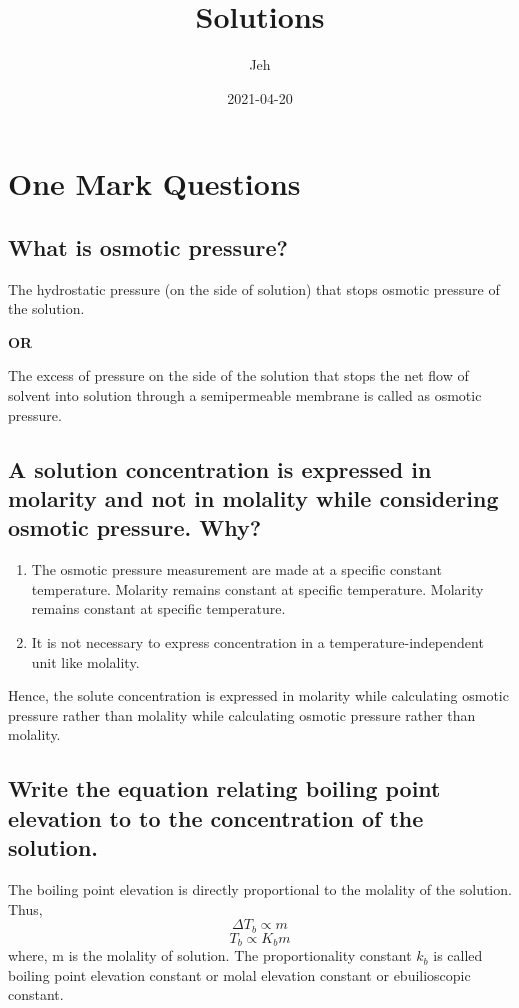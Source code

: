\documentclass{article}
\title{Solutions}
\date{2021-04-20}
\author{Jeh}
\begin{document}
\maketitle
{}
   \section{One Mark Questions}
   \subsection{What is osmotic pressure?}
   The hydrostatic pressure (on the side of solution) that stops
   osmotic pressure of the solution.
   \begin{center} \textbf{OR} \end{center}
   The excess of pressure on the side of the solution that stops the
   net flow of solvent into solution through a semipermeable membrane
   is called as osmotic pressure.

   \subsection{A solution concentration is expressed in molarity and
   not in molality while considering osmotic pressure. Why?}
   \begin{enumerate}
	\item The osmotic pressure measurement are made at a specific
        constant temperature. Molarity remains constant at specific
	temperature. Molarity remains constant at specific
	temperature.
    	\item It is not necessary to express concentration in a
	temperature-independent unit like molality.
   \end{enumerate}
   Hence, the solute concentration is expressed in molarity while
   calculating osmotic pressure rather than molality while calculating
   osmotic pressure rather than molality.

   \subsection{Write the equation relating boiling point elevation to
   to the concentration of the solution.}
   The boiling point elevation is directly proportional to the molality
   of the solution. Thus,
   \begin{equation} \Delta T_b \propto m \end{equation}
   \begin{equation} T_b \propto K_b m \end{equation}
   where, m is the molality of solution. The proportionality constant
   $k_b$ is called boiling point elevation constant or molal elevation
   constant or ebuilioscopic constant.
\end{document}
